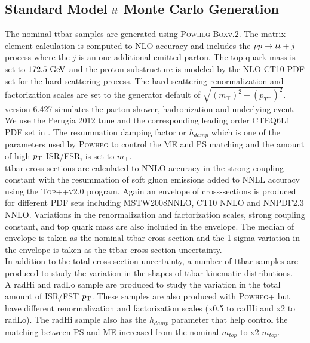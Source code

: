 \subsection{Standard Model $t\bar{t}$ Monte Carlo Generation}

\indent The nominal ttbar samples are generated using \textsc{Powheg-Box}v.2.  The matrix element calculation is computed to NLO accuracy and includes the $pp \rightarrow t\bar{t} + j$ process where the $j$ is an one additional emitted parton.  The top quark mass is set to $172.5 \gev$ and the proton substructure is modeled by the NLO CT10 PDF set \cite{CT10} for the hard scattering process.  The hard scattering renormalization and factorization scales are set to the generator default of $\sqrt{(m_{\top})^2 + (p_{T \top})^2}$.  \\

\indent {} version 6.427 simulates the parton shower, hadronization and underlying event.  We use the Perugia 2012 tune \cite{Perugia2012} and the corresponding leading order CTEQ6L1 PDF set \cite{CTEQ6L1} in .  The resummation damping factor or $h_{damp}$ which is one of the parameters used by \textsc{Powheg} to control the ME and PS matching and the amount of high-$p_{\mathrm{T}}$ ISR/FSR, is set to $m_{\top}$. \\

\indent ttbar cross-sections are calculated to NNLO accuracy in the strong coupling constant with the resummation of soft gluon emissions added to NNLL accuracy using the \textsc{Top++v2.0} program. \cite{topXsec}  Again an envelope of cross-sections is produced for different PDF sets including MSTW2008NNLO, CT10 NNLO and NNPDF2.3 NNLO.  Variations in the renormalization and factorization scales, strong coupling constant, and top quark mass are also included in the envelope.  The median of envelope is taken as the nominal ttbar cross-section and the 1 sigma variation in the envelope is taken as the ttbar cross-section uncertainty.  \\

\indent In addition to the total cross-section uncertainty, a number of ttbar samples are produced to study the variation in the shapes of ttbar kinematic distributions. \\
\indent  A radHi and radLo sample are produced to study the variation in the total amount of ISR/FST $p_{\mathrm{T}}$.  These samples are also produced with \textsc{Powheg+} but have different renormalization and factorization scales (x0.5 to radHi and x2 to radLo). The radHi sample also has the $h_{damp}$ parameter that help control the matching between PS and ME increased from the nominal $m_{top}$ to x2 $m_{top}$. \\

